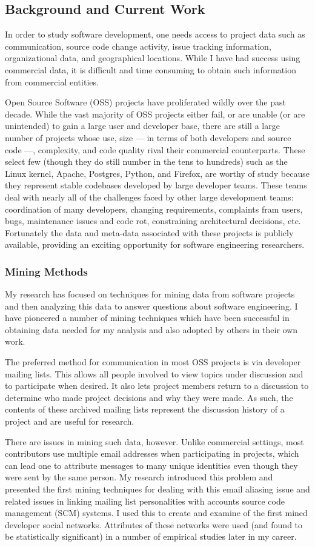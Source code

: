 \documentclass[10pt]{article}
\newcommand\Section[1]{\section*{#1}}
\newcommand\Subsection[1]{\subsubsection*{#1}}
\begin{document}
\begin{small}
\Section{Background and Current Work}

In order to study software development, one needs access to project data such
as communication, source code change activity, issue tracking information,
organizational data, and geographical locations.  While I have had success
using commercial data, it is difficult and time consuming to
obtain such information from commercial entities. 

Open Source Software (OSS) projects have proliferated wildly over the past
decade.  While the vast majority of OSS projects either fail, or are unable (or
are unintended) to gain a large user and developer base, there are still a
large number of projects whose use, size --- in terms of both developers and source
code ---, complexity, and code quality rival their commercial counterparts.  These
select few (though they do still number in the tens to hundreds) such as the
Linux kernel, Apache, Postgres, Python, and Firefox, are worthy of study
because they represent stable codebases developed by large developer teams.
These teams deal with nearly all of the challenges faced by other large
development teams: coordination of many developers, changing requirements,
complaints fram users, bugs, maintenance issues and code rot,
constraining architectural decisions, etc.  Fortunately the data and meta-data
associated with these projects is publicly available, providing an exciting
opportunity for software engineering researchers.

\Subsection{Mining Methods}

My research has focused on techniques for mining data from software projects
and then analyzing this data to answer questions about software engineering.  I
have pioneered a number of mining techniques which have been successful in
obtaining data needed for my analysis and also adopted by others in their own
work.

The preferred method for communication in most OSS projects is via developer
mailing lists.  This allows all people involved to view topics under discussion
and to participate when desired.  It also lets project members return to a
discussion to determine who made project decisions and why they were made.  As
such, the contents of these archived mailing lists represent the discussion
history of a project and are useful for research.

There are issues in mining such data, however.  Unlike commercial settings, most
contributors use multiple email addresses when participating in projects, which
can lead one to attribute messages to many unique identities even though they were
sent by the same person.  My research introduced this problem and presented the
first mining techniques for dealing with this email aliasing issue and 
related issues in linking mailing list personalities with accounts source code
management (SCM) systems.  I used this to create and examine of the
first mined developer social networks.  Attributes of these networks were
used (and found to be statistically significant) in a number of empirical studies
later in my career.


\end{small}
\end{document}
